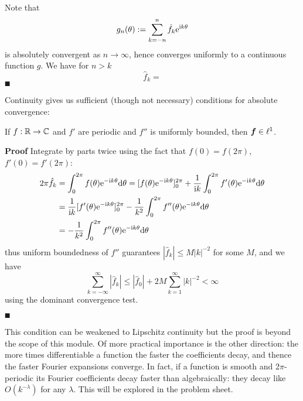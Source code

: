 Note that
\[
g_n(\ensuremath{\theta}) := \ensuremath{\sum}_{k = -n}^n \hat f_k {\rm e}^{{\rm i} k \ensuremath{\theta}}
\]
is absolutely convergent as $n \ensuremath{\rightarrow} \ensuremath{\infty}$, hence converges uniformly to a continuous function $g$. We have for $n > k$
\[
\hat f_k =
\]
\ensuremath{\QED}

Continuity gives us sufficient (though not necessary) conditions for absolute convergence:

\begin{lemma} If $f : {\mathbb R} \rightarrow {\mathbb C}$ and $f'$ are periodic  and $f''$ is uniformly bounded, then ${\mbox{\boldmath$f$\unboldmath}} \in \ell^1$.

\end{lemma}
\textbf{Proof} Integrate by parts twice using the fact that $f(0) = f(2\ensuremath{\pi})$, $f'(0) = f'(2\ensuremath{\pi})$:
\begin{align*}
2\ensuremath{\pi}\hat f_k &= \ensuremath{\int}_0^{2\ensuremath{\pi}} f(\ensuremath{\theta}) {\rm e}^{-{\rm i} k \ensuremath{\theta}} {\rm d}\ensuremath{\theta} =
[f(\ensuremath{\theta}) {\rm e}^{-{\rm i} k \ensuremath{\theta}}]_0^{2\ensuremath{\pi}} + {1 \over {\rm i} k} \ensuremath{\int}_0^{2\ensuremath{\pi}} f'(\ensuremath{\theta}) {\rm e}^{-{\rm i} k \ensuremath{\theta}} {\rm d}\ensuremath{\theta} \\
&= {1 \over {\rm i} k} [f'(\ensuremath{\theta}) {\rm e}^{-{\rm i} k \ensuremath{\theta}}]_0^{2\ensuremath{\pi}} - {1 \over k^2} \ensuremath{\int}_0^{2\ensuremath{\pi}} f''(\ensuremath{\theta}) {\rm e}^{-{\rm i} k \ensuremath{\theta}} {\rm d}\ensuremath{\theta} \\
&= - {1 \over k^2} \ensuremath{\int}_0^{2\ensuremath{\pi}} f''(\ensuremath{\theta}) {\rm e}^{-{\rm i} k \ensuremath{\theta}} {\rm d}\ensuremath{\theta}
\end{align*}
thus uniform boundedness of $f''$ guarantees $|\hat f_k| \ensuremath{\leq} M |k|^{-2}$ for some $M$, and we have
\[
\ensuremath{\sum}_{k = -\ensuremath{\infty}}^\ensuremath{\infty} |\hat f_k| \ensuremath{\leq} |\hat f_0|  + 2M \ensuremath{\sum}_{k = 1}^\ensuremath{\infty} |k|^{-2}  < \ensuremath{\infty}
\]
using the dominant convergence test.

\ensuremath{\QED}

This condition can be weakened to Lipschitz continuity but the proof is  beyond the scope of this module. Of more practical importance is the other direction: the more times differentiable a function the faster the coefficients decay, and thence the faster Fourier expansions converge. In fact, if a function is smooth and 2\ensuremath{\pi}-periodic its Fourier coefficients decay faster than algebraically: they decay like $O(k^{-\ensuremath{\lambda}})$ for any $\ensuremath{\lambda}$. This will be explored in the problem sheet.

